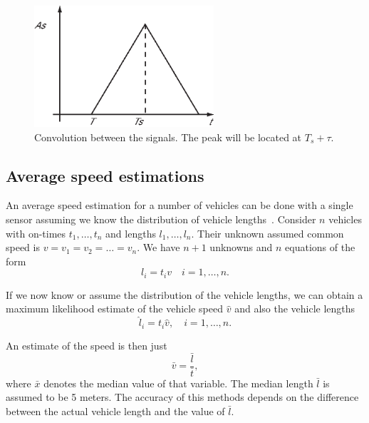 \begin{subfigures}
\begin{figure}[!htb]
\begin{minipage}{0.45\linewidth}
  \centering
   \includegraphics[height=4.5cm]{images/conv3}
  \caption[Synchronisation time]{Convolution between the signals. The peak will be located at $T_s + \tau$.}
  \label{fig-conv3}
  \end{minipage}
 \end{figure}
\end{subfigures}

\subsection{Average speed estimations}\label{sec:avg}

An average speed estimation for a number of vehicles can be done with a single sensor assuming we know the distribution of vehicle lengths~\cite{cheung2005-2}. Consider $n$ vehicles with on-times $t_1, \ldots, t_n$ and lengths $l_1, \dots, l_n$. Their unknown assumed common speed is $v = v_1 = v_2 = \ldots = v_n$. We have $n+1$ unknowns and $n$ equations of the form
\begin{equation}
	l_i = t_i v \quad i=1, \dots, n. %
\end{equation}

If we now know or assume the distribution of the vehicle lengths, we can obtain a maximum likelihood estimate of the vehicle speed $\hat{v}$ and also the vehicle lengths
\begin{equation}
 \hat{l}_i = {t_i}{\hat{v}}, \quad i=1, \dots, n. %
 \label{eq:hatl}
\end{equation}

An estimate of the speed is then just
\begin{equation}
 \bar{v} = \frac{\bar{l}}{\bar{t}},
\end{equation}
where $\bar{x}$ denotes the median value of that variable. The median length $\bar{l}$ is assumed to be 5 meters. The accuracy of this methods depends on the difference between the actual vehicle length and the value of $\bar{l}$.

